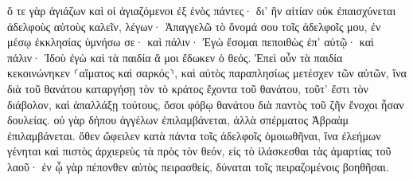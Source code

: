 \documentclass{openreader}
\begin{document}
ὅ τε γὰρ ἁγιάζων καὶ οἱ ἁγιαζόμενοι ἐξ ἑνὸς πάντες· δι’ ἣν αἰτίαν οὐκ ἐπαισχύνεται ἀδελφοὺς αὐτοὺς καλεῖν, 
λέγων· Ἀπαγγελῶ τὸ ὄνομά σου τοῖς ἀδελφοῖς μου, ἐν μέσῳ ἐκκλησίας ὑμνήσω σε· 
καὶ πάλιν· Ἐγὼ ἔσομαι πεποιθὼς ἐπ’ αὐτῷ· καὶ πάλιν· Ἰδοὺ ἐγὼ καὶ τὰ παιδία ἅ μοι ἔδωκεν ὁ θεός. 
Ἐπεὶ οὖν τὰ παιδία κεκοινώνηκεν ⸂αἵματος καὶ σαρκός⸃, καὶ αὐτὸς παραπλησίως μετέσχεν τῶν αὐτῶν, ἵνα διὰ τοῦ θανάτου καταργήσῃ τὸν τὸ κράτος ἔχοντα τοῦ θανάτου, τοῦτ’ ἔστι τὸν διάβολον, 
καὶ ἀπαλλάξῃ τούτους, ὅσοι φόβῳ θανάτου διὰ παντὸς τοῦ ζῆν ἔνοχοι ἦσαν δουλείας. 
οὐ γὰρ δήπου ἀγγέλων ἐπιλαμβάνεται, ἀλλὰ σπέρματος Ἀβραὰμ ἐπιλαμβάνεται. 
ὅθεν ὤφειλεν κατὰ πάντα τοῖς ἀδελφοῖς ὁμοιωθῆναι, ἵνα ἐλεήμων γένηται καὶ πιστὸς ἀρχιερεὺς τὰ πρὸς τὸν θεόν, εἰς τὸ ἱλάσκεσθαι τὰς ἁμαρτίας τοῦ λαοῦ· 
ἐν ᾧ γὰρ πέπονθεν αὐτὸς πειρασθείς, δύναται τοῖς πειραζομένοις βοηθῆσαι. 
\end{document}
